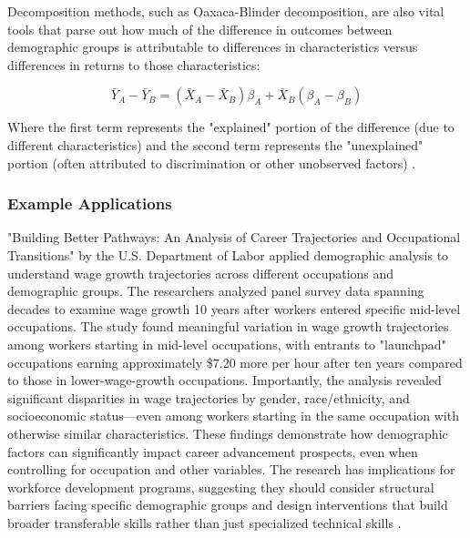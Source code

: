 \documentclass[../main.tex]{subfiles}
\begin{document}
Decomposition methods, such as Oaxaca-Blinder decomposition, are also vital tools that parse out how much of the difference in outcomes between demographic groups is attributable to differences in characteristics versus differences in returns to those characteristics:

\begin{equation}
\bar{Y}_A - \bar{Y}_B = (\bar{X}_A - \bar{X}_B)\beta_A + \bar{X}_B(\beta_A - \beta_B)
\end{equation}

Where the first term represents the "explained" portion of the difference (due to different characteristics) and the second term represents the "unexplained" portion (often attributed to discrimination or other unobserved factors) \parencite{dol2023building,baker2023demographic}.

\subsubsection{Example Applications}

"Building Better Pathways: An Analysis of Career Trajectories and Occupational Transitions" by the U.S. Department of Labor applied demographic analysis to understand wage growth trajectories across different occupations and demographic groups. The researchers analyzed panel survey data spanning decades to examine wage growth 10 years after workers entered specific mid-level occupations. The study found meaningful variation in wage growth trajectories among workers starting in mid-level occupations, with entrants to "launchpad" occupations earning approximately \$7.20 more per hour after ten years compared to those in lower-wage-growth occupations. Importantly, the analysis revealed significant disparities in wage trajectories by gender, race/ethnicity, and socioeconomic status—even among workers starting in the same occupation with otherwise similar characteristics. These findings demonstrate how demographic factors can significantly impact career advancement prospects, even when controlling for occupation and other variables. The research has implications for workforce development programs, suggesting they should consider structural barriers facing specific demographic groups and design interventions that build broader transferable skills rather than just specialized technical skills \parencite{dol2023building}.
\end{document}
